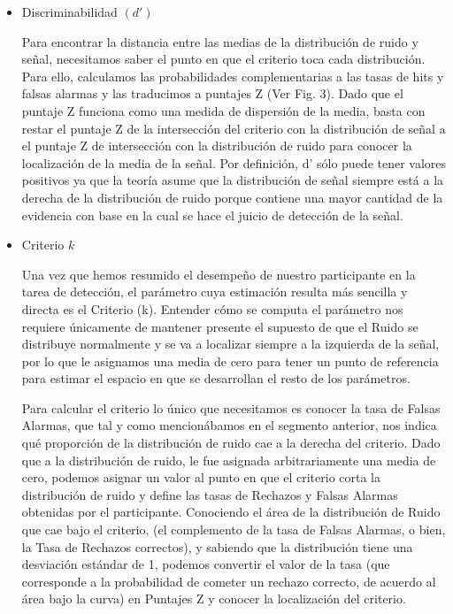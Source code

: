 \begin{itemize}
\item Discriminabilidad $(d')$

Para encontrar la distancia entre las medias de la distribución de ruido y señal, necesitamos saber el punto en que el criterio toca cada distribución. Para ello, calculamos las probabilidades complementarias a las tasas de hits y falsas alarmas y las traducimos a puntajes Z (Ver Fig. 3). Dado que el puntaje Z funciona como una medida de dispersión de la media, basta con restar el puntaje Z de la intersección del criterio con la distribución de señal a el puntaje Z de intersección con la distribución de ruido para conocer la localización de la media de la señal. Por definición, d’ sólo puede tener valores positivos ya que la teoría asume que la distribución de señal siempre está a la derecha de la distribución de ruido porque contiene una mayor cantidad de la evidencia con base en la cual se hace el juicio de detección de la señal.



\item Criterio  $k$

Una vez que hemos resumido el desempeño de nuestro participante en la tarea de detección, el parámetro cuya estimación resulta más sencilla y directa es el Criterio (k). Entender cómo se computa el parámetro nos requiere únicamente de mantener presente el supuesto de que el Ruido se distribuye normalmente y se va a localizar siempre a la izquierda de la señal, por lo que le asignamos una media de cero para tener un punto de referencia para estimar el espacio en que se desarrollan el resto de los parámetros. 

Para calcular el criterio lo único que necesitamos es conocer la tasa de Falsas Alarmas, que tal y como mencionábamos en el segmento anterior, nos indica qué proporción de la distribución de ruido cae a la derecha del criterio. Dado que a la distribución de ruido, le fue asignada arbitrariamente una media de cero, podemos asignar un valor al punto en que el criterio corta la distribución de ruido y define las tasas de Rechazos y Falsas Alarmas obtenidas por el participante. Conociendo el área de la distribución de Ruido que cae bajo el criterio, (el complemento de la tasa de Falsas Alarmas, o bien, la Tasa de Rechazos correctos), y sabiendo que la distribución tiene una desviación estándar de 1, podemos convertir el valor de la tasa (que corresponde a la probabilidad de cometer un rechazo correcto, de acuerdo al área bajo la curva) en Puntajes Z y conocer la localización del criterio.


\end{itemize}

